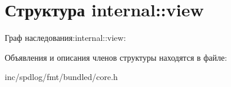 \hypertarget{structinternal_1_1view}{}\section{Структура internal\+:\+:view}
\label{structinternal_1_1view}


Граф наследования\+:internal\+:\+:view\+:


Объявления и описания членов структуры находятся в файле\+:\begin{DoxyCompactItemize}
\item 
inc/spdlog/fmt/bundled/core.\+h\end{DoxyCompactItemize}
